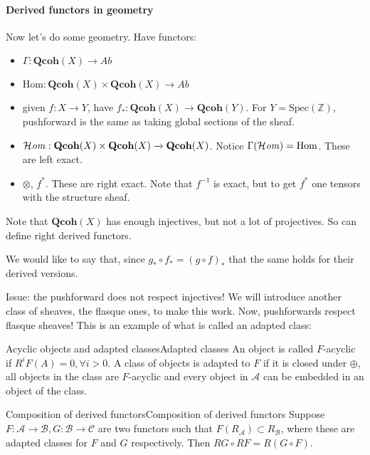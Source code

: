 \paragraph{Derived functors in geometry}
Now let's do some geometry. Have functors: 

\begin{itemize}
    \item $\Gamma:\mathbf{Qcoh}(X)\xrightarrow{}Ab$
    \item $\mathrm{Hom}: \mathbf{Qcoh}(X)\times \mathbf{Qcoh}(X)\xrightarrow{ }Ab$
    \item given $f:X\xrightarrow{ }Y$, have $f_*:\mathbf{Qcoh}(X)\xrightarrow{}\mathbf{Qcoh}(Y)$. For $Y=\mathrm{Spec}(\mathbb{Z})$, pushforward is the same as taking global sections of the sheaf.
    \item $\operatorname{\mathcal{H}\mathit{om}}:\mathbf{Qcoh}(X)\times \mathbf{Qcoh}(X)\xrightarrow{} \mathbf{Qcoh}(X)$. Notice $\Gamma(\operatorname{\mathcal{H}\mathit{om}})=\mathrm{Hom}$. These are left exact.
    \item $\otimes$, $f^*$. These are right exact. Note that $f^{-1}$ is exact, but to get $f^*$ one tensors with the structure sheaf. 
\end{itemize}

Note that $\mathbf{Qcoh}(X)$ has enough injectives, but not a lot of projectives. So can define right derived functors.

We would like to say that, since $g_{*}\circ f_{*}=(g\circ f)_{*}$ that the same holds for their derived versions.

Issue: the pushforward does not respect injectives! We will introduce another class of sheaves, the flasque ones, to make this work. Now, pushforwards respect flasque sheaves! This is an example of what is called an adapted class:

\begin{definition}{Acyclic objects and adapted classes}{Adapted classes}
     An object is called $F$-acyclic if $R^iF(A)=0, \forall i>0$. A class of objects is adapted to $F$ if it is closed under $\oplus$, all objects in the class are $F$-acyclic and every object in $\mathcal{A}$ can be embedded in an object of the class.
        
\end{definition}

\begin{theorem}{Composition of derived functors}{Composition of derived functors}
    Suppose $F:\mathcal{A}\xrightarrow{}\mathcal{B}, G:\mathcal{B}\xrightarrow{}\mathcal{C}$ are two functors such that $F(R_{\mathcal{A}})\subset R_{\mathcal{B}}$, where these are adapted classes for $F$ and $G$ respectively. Then $RG\circ RF = R(G\circ F)$.
\end{theorem}

